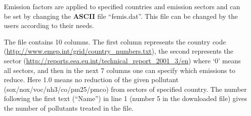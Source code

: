 Emission factors are applied to specified countries and
emission sectors and can be set by changing the {\bf ASCII} file
``femis.dat''. 
This file can be changed by the users according to their needs.

The file contains 10 columns. The first column represents
the country code (\url{http://www.emep.int/grid/country_numbers.txt}),
the second represents the sector
(\url{http://reports.eea.eu.int/technical_report_2001_3/en}) 
where `0' means all sectors, and then in the next 7 columns one can specify
which emissions to reduce. Here 1.0 means no reduction of the given
pollutant 
(sox/nox/voc/nh3/co/pm25/pmco) from sectors of specified country. The
number following the first text (``Name'') in line 1 (number 5 in
the downloaded file) gives the number of pollutants treated in the file.

